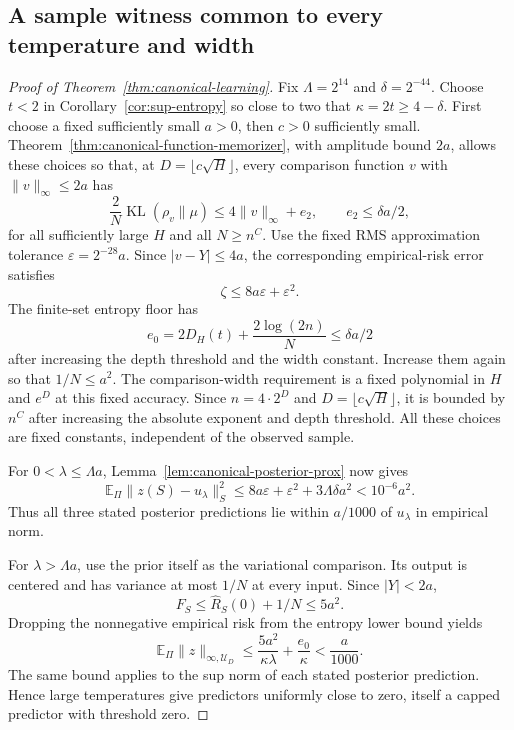 \subsection{A sample witness common to every temperature and width}
\begin{proof}[Proof of Theorem~\ref{thm:canonical-learning}]
Fix $\Lambda=2^{14}$ and $\delta=2^{-44}$. Choose $t<2$ in Corollary~\ref{cor:sup-entropy} so close to two that $\kappa=2t\ge4-\delta$. First choose a fixed sufficiently small $a>0$, then $c>0$ sufficiently small. Theorem~\ref{thm:canonical-function-memorizer}, with amplitude bound $2a$, allows these choices so that, at $D=\lfloor c\sqrt H\rfloor$, every comparison function $v$ with $\|v\|_\infty\le2a$ has
\[
 \frac2N\operatorname{KL}(\rho_v\|\mu)\le4\|v\|_\infty+e_2,
 \qquad e_2\le\delta a/2,
\]
for all sufficiently large $H$ and all $N\ge n^C$. Use the fixed RMS approximation tolerance $\varepsilon=2^{-28}a$. Since $|v-Y|\le4a$, the corresponding empirical-risk error satisfies
\[
 \zeta\le8a\varepsilon+\varepsilon^2.
\]
The finite-set entropy floor has
\[
 e_0=2D_H(t)+\frac{2\log(2n)}N\le\delta a/2
\]
after increasing the depth threshold and the width constant. Increase them again so that $1/N\le a^2$. The comparison-width requirement is a fixed polynomial in $H$ and $e^D$ at this fixed accuracy. Since $n=4\cdot2^D$ and $D=\lfloor c\sqrt H\rfloor$, it is bounded by $n^C$ after increasing the absolute exponent and depth threshold. All these choices are fixed constants, independent of the observed sample.

For $0<\lambda\le\Lambda a$, Lemma~\ref{lem:canonical-posterior-prox} now gives
\[
 \mathbb E_\Pi\|z(S)-u_\lambda\|_S^2
 \le8a\varepsilon+\varepsilon^2+3\Lambda\delta a^2
 <10^{-6}a^2.
 \label{eq:canonical-small-temp}
\]
Thus all three stated posterior predictions lie within $a/1000$ of $u_\lambda$ in empirical norm.

For $\lambda>\Lambda a$, use the prior itself as the variational comparison. Its output is centered and has variance at most $1/N$ at every input. Since $|Y|<2a$,
\[
 F_S\le\widehat R_S(0)+1/N\le5a^2.
\]
Dropping the nonnegative empirical risk from the entropy lower bound yields
\[
 \mathbb E_\Pi\|z\|_{\infty,\mathcal U_D}
 \le\frac{5a^2}{\kappa\lambda}+\frac{e_0}{\kappa}
 <\frac a{1000}.
\]
The same bound applies to the sup norm of each stated posterior prediction. Hence large temperatures give predictors uniformly close to zero, itself a capped predictor with threshold zero.


\end{proof}
